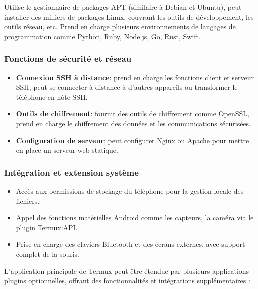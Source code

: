 Utilise le gestionnaire de packages APT (similaire à Debian et Ubuntu), peut installer des milliers de packages Linux, couvrant les outils de développement, les outils réseau, etc. Prend en charge plusieurs environnements de langages de programmation comme Python, Ruby, Node.js, Go, Rust, Swift.

\subsubsection*{Fonctions de sécurité et réseau}

\begin{itemize}
  \item \textbf{Connexion SSH à distance}: prend en charge les fonctions client et serveur SSH, peut se connecter à distance à d'autres appareils ou transformer le téléphone en hôte SSH.
  \item \textbf{Outils de chiffrement}: fournit des outils de chiffrement comme OpenSSL, prend en charge le chiffrement des données et les communications sécurisées.
  \item \textbf{Configuration de serveur}: peut configurer Nginx ou Apache pour mettre en place un serveur web statique.
\end{itemize}

\subsubsection*{Intégration et extension système}

\begin{itemize}
  \item Accès aux permissions de stockage du téléphone pour la gestion locale des fichiers.
  \item Appel des fonctions matérielles Android comme les capteurs, la caméra via le plugin Termux:API.
  \item Prise en charge des claviers Bluetooth et des écrans externes, avec support complet de la souris.
\end{itemize}


L'application principale de Termux peut être étendue par plusieurs applications plugins optionnelles, offrant des fonctionnalités et intégrations supplémentaires :

